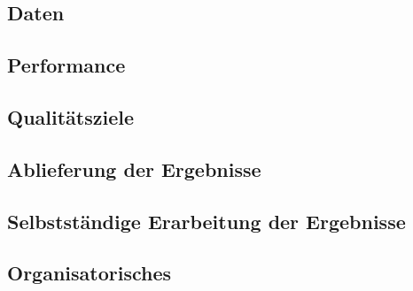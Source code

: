 \subsection{Daten}

\subsection{Performance}
\subsection{Qualitätsziele}
\subsection{Ablieferung der Ergebnisse}
\subsection{Selbstständige Erarbeitung der Ergebnisse}
\subsection{Organisatorisches}
